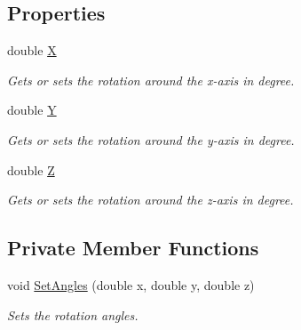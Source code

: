 \subsection*{Properties}
\begin{DoxyCompactItemize}
\item 
double \hyperlink{class_lib_noise_1_1_operator_1_1_rotate_a5c42a67dfa58fc688c145a3b3971d741}{X}
\begin{DoxyCompactList}\small\item\em Gets or sets the rotation around the x-\/axis in degree. \end{DoxyCompactList}\item 
double \hyperlink{class_lib_noise_1_1_operator_1_1_rotate_aec1ab96c96d77a72587fb4aa4ff957cd}{Y}
\begin{DoxyCompactList}\small\item\em Gets or sets the rotation around the y-\/axis in degree. \end{DoxyCompactList}\item 
double \hyperlink{class_lib_noise_1_1_operator_1_1_rotate_a84d039eb6c6965ace980329a78cf8472}{Z}
\begin{DoxyCompactList}\small\item\em Gets or sets the rotation around the z-\/axis in degree. \end{DoxyCompactList}\end{DoxyCompactItemize}
\subsection*{Private Member Functions}
\begin{DoxyCompactItemize}
\item 
void \hyperlink{class_lib_noise_1_1_operator_1_1_rotate_ab2576014464fc7be687496116e91aff6}{Set\+Angles} (double x, double y, double z)
\begin{DoxyCompactList}\small\item\em Sets the rotation angles. \end{DoxyCompactList}\end{DoxyCompactItemize}
